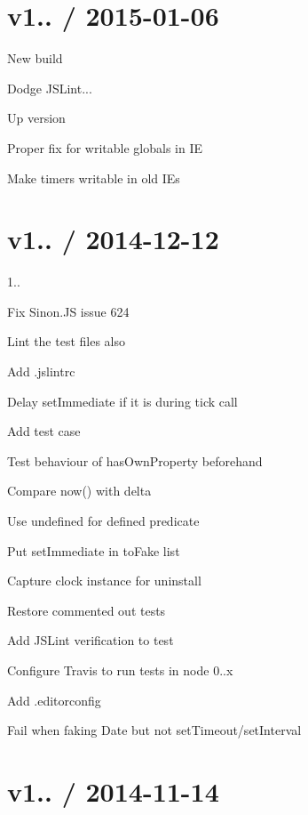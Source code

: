 \section*{v1.. / 2015-\/01-\/06 }


\begin{DoxyItemize}
\item New build
\item Dodge J\+S\+Lint...
\item Up version
\item Proper fix for writable globals in IE
\item Make timers writable in old I\+Es
\end{DoxyItemize}

\section*{v1.. / 2014-\/12-\/12 }


\begin{DoxyItemize}
\item 1..
\item Fix Sinon.\+JS issue 624
\item Lint the test files also
\item Add .jslintrc
\item Delay set\+Immediate if it is during tick call
\item Add test case
\item Test behaviour of has\+Own\+Property beforehand
\item Compare now() with delta
\item Use undefined for defined predicate
\item Put set\+Immediate in to\+Fake list
\item Capture clock instance for uninstall
\item Restore commented out tests
\item Add J\+S\+Lint verification to test
\item Configure Travis to run tests in node 0..\+x
\item Add .editorconfig
\item Fail when faking Date but not set\+Timeout/set\+Interval
\end{DoxyItemize}

\section*{v1.. / 2014-\/11-\/14 }


